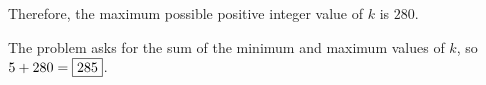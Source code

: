 \begin{enumerate}
 Therefore, the maximum possible positive integer value of $k$ is $280$.

 The problem asks for the sum of the minimum and maximum values of $k$, so $5+280=\framebox{285}$.

 


\end{enumerate}